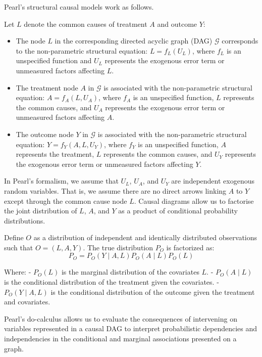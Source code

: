 \documentclass[
  single column]{article}
\providecommand{\tightlist}{%
  \setlength{\itemsep}{0pt}\setlength{\parskip}{0pt}}\usepackage{longtable,booktabs,array}
\begin{document}
Pearl's structural causal models work as follows.

Let \(L\) denote the common causes of treatment \(A\) and outcome \(Y\):

\begin{itemize}
\tightlist
\item
  The node \(L\) in the corresponding directed acyclic graph (DAG)
  \(\mathcal{G}\) corresponds to the non-parametric structural equation:
  \(L = f_L(U_L)\), where \(f_L\) is an unspecified function and \(U_L\)
  represents the exogenous error term or unmeasured factors affecting
  \(L\).
\item
  The treatment node \(A\) in \(\mathcal{G}\) is associated with the
  non-parametric structural equation: \(A = f_A(L, U_A)\), where \(f_A\)
  is an unspecified function, \(L\) represents the common causes, and
  \(U_A\) represents the exogenous error term or unmeasured factors
  affecting \(A\).
\item
  The outcome node \(Y\) in \(\mathcal{G}\) is associated with the
  non-parametric structural equation: \(Y = f_Y(A, L, U_Y)\), where
  \(f_Y\) is an unspecified function, \(A\) represents the treatment,
  \(L\) represents the common causes, and \(U_Y\) represents the
  exogenous error term or unmeasured factors affecting \(Y\).
\end{itemize}

In Pearl's formalism, we assume that \(U_L\), \(U_A\), and \(U_Y\) are
independent exogenous random variables. That is, we assume there are no
direct arrows linking \(A\) to \(Y\) except through the common cause
node \(L\). Causal diagrams allow us to factorise the joint distribution
of \(L\), \(A\), and \(Y\) as a product of conditional probability
distributions.

Define \(O\) as a distribution of independent and identically
distributed observations such that \(O = (L, A, Y)\). The true
distribution \(P_O\) is factorized as: \[
P_O = P_O(Y \mid A, L) P_O(A \mid L) P_O(L)
\]

Where: - \(P_O(L)\) is the marginal distribution of the covariates
\(L\). - \(P_O(A \mid L)\) is the conditional distribution of the
treatment given the covariates. - \(P_O(Y \mid A, L)\) is the
conditional distribution of the outcome given the treatment and
covariates.

Pearl's do-calculus allows us to evaluate the consequences of
intervening on variables represented in a causal DAG to interpret
probabilistic dependencies and independencies in the conditional and
marginal associations presented on a graph.
\end{document}
